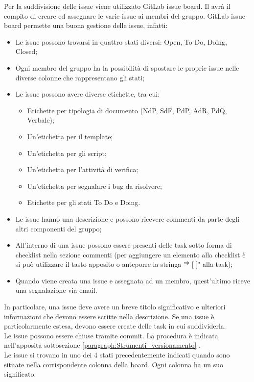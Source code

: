 Per la suddivisione delle issue viene utilizzato GitLab issue board. Il \roleProjectManager{} avrà il compito di creare ed assegnare le varie issue ai membri del gruppo. GitLab issue board permette una buona gestione delle issue, infatti:
\begin{itemize}
	\item Le issue possono trovarsi in quattro stati diversi: Open, To Do, Doing, Closed;
	\item Ogni membro del gruppo ha la possibilità di spostare le proprie issue nelle diverse colonne che rappresentano gli stati;
	\item Le issue possono avere diverse etichette, tra cui:
	\begin{itemize}
		\item Etichette per tipologia di documento (NdP, SdF, PdP, AdR, PdQ, Verbale);
		\item Un'etichetta per il template;
		\item Un'etichetta per gli script;
		\item Un'etichetta per l'attività di verifica; 
		\item Un'etichetta per segnalare i bug da risolvere;
		\item Etichette per gli stati To Do e Doing.
	\end{itemize}
	\item Le issue hanno una descrizione e possono ricevere commenti da parte degli altri componenti del gruppo;
	\item All'interno di una issue possono essere presenti delle task sotto forma di checklist nella sezione commenti (per aggiungere un elemento alla checklist è si può utilizzare il tasto apposito o anteporre la stringa "* [ ]" alla task);
	\item Quando viene creata una issue e assegnata ad un membro, quest'ultimo riceve una segnalazione via email.
\end{itemize}
In particolare, una issue deve avere un breve titolo significativo e ulteriori informazioni che devono essere scritte nella descrizione. Se una issue è particolarmente estesa, devono essere create delle task in cui suddividerla.\\
Le issue possono essere chiuse tramite commit. La procedura è indicata nell'apposita sottosezione \ref{paragraph:Strumenti_versionamento} .
\\Le issue si trovano in uno dei 4 stati precedentemente indicati quando sono situate nella corrispondente colonna della board. Ogni colonna ha un suo significato:
